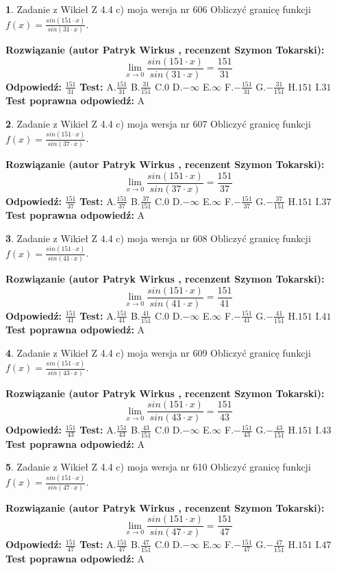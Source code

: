\documentclass[12pt, a4paper]{article}
\theoremstyle{definition} %
\newtheorem{zad}{}
\newcommand{\zadStart}[1]{\begin{zad}#1\newline}
\newcommand{\zadStop}{\end{zad}}
\newcommand{\rozwStart}[2]{\noindent \textbf{Rozwiązanie (autor #1 , recenzent #2): }\newline}
\newcommand{\rozwStop}{\newline}
\newcommand{\odpStart}{\noindent \textbf{Odpowiedź:}\newline}
\newcommand{\odpStop}{\newline}
\newcommand{\testStart}{\noindent \textbf{Test:}\newline}
\newcommand{\testStop}{\newline}
\newcommand{\kluczStart}{\noindent \textbf{Test poprawna odpowiedź:}\newline}
\newcommand{\kluczStop}{\newline}
\begin{document}
\zadStart{Zadanie z Wikieł Z 4.4 c) moja wersja nr 606}
Obliczyć granicę funkcji $f(x)=\frac{sin(151\cdot x)}{sin(31\cdot x)}$.
\zadStop
\rozwStart{Patryk Wirkus}{Szymon Tokarski}
$$\lim\limits_{x\to 0}\frac{sin(151\cdot x)}{sin(31\cdot x)}=
\frac{151}{31}$$
\rozwStop
\odpStart
$\frac{151}{31}$
\odpStop
\testStart
A.$\frac{151}{31}$
B.$\frac{31}{151}$
C.$0$
D.$-\infty$
E.$\infty$
F.$-\frac{151}{31}$
G.$-\frac{31}{151}$
H.$151$
I.$31$
\testStop
\kluczStart
A
\kluczStop



\zadStart{Zadanie z Wikieł Z 4.4 c) moja wersja nr 607}
Obliczyć granicę funkcji $f(x)=\frac{sin(151\cdot x)}{sin(37\cdot x)}$.
\zadStop
\rozwStart{Patryk Wirkus}{Szymon Tokarski}
$$\lim\limits_{x\to 0}\frac{sin(151\cdot x)}{sin(37\cdot x)}=
\frac{151}{37}$$
\rozwStop
\odpStart
$\frac{151}{37}$
\odpStop
\testStart
A.$\frac{151}{37}$
B.$\frac{37}{151}$
C.$0$
D.$-\infty$
E.$\infty$
F.$-\frac{151}{37}$
G.$-\frac{37}{151}$
H.$151$
I.$37$
\testStop
\kluczStart
A
\kluczStop



\zadStart{Zadanie z Wikieł Z 4.4 c) moja wersja nr 608}
Obliczyć granicę funkcji $f(x)=\frac{sin(151\cdot x)}{sin(41\cdot x)}$.
\zadStop
\rozwStart{Patryk Wirkus}{Szymon Tokarski}
$$\lim\limits_{x\to 0}\frac{sin(151\cdot x)}{sin(41\cdot x)}=
\frac{151}{41}$$
\rozwStop
\odpStart
$\frac{151}{41}$
\odpStop
\testStart
A.$\frac{151}{41}$
B.$\frac{41}{151}$
C.$0$
D.$-\infty$
E.$\infty$
F.$-\frac{151}{41}$
G.$-\frac{41}{151}$
H.$151$
I.$41$
\testStop
\kluczStart
A
\kluczStop



\zadStart{Zadanie z Wikieł Z 4.4 c) moja wersja nr 609}
Obliczyć granicę funkcji $f(x)=\frac{sin(151\cdot x)}{sin(43\cdot x)}$.
\zadStop
\rozwStart{Patryk Wirkus}{Szymon Tokarski}
$$\lim\limits_{x\to 0}\frac{sin(151\cdot x)}{sin(43\cdot x)}=
\frac{151}{43}$$
\rozwStop
\odpStart
$\frac{151}{43}$
\odpStop
\testStart
A.$\frac{151}{43}$
B.$\frac{43}{151}$
C.$0$
D.$-\infty$
E.$\infty$
F.$-\frac{151}{43}$
G.$-\frac{43}{151}$
H.$151$
I.$43$
\testStop
\kluczStart
A
\kluczStop



\zadStart{Zadanie z Wikieł Z 4.4 c) moja wersja nr 610}
Obliczyć granicę funkcji $f(x)=\frac{sin(151\cdot x)}{sin(47\cdot x)}$.
\zadStop
\rozwStart{Patryk Wirkus}{Szymon Tokarski}
$$\lim\limits_{x\to 0}\frac{sin(151\cdot x)}{sin(47\cdot x)}=
\frac{151}{47}$$
\rozwStop
\odpStart
$\frac{151}{47}$
\odpStop
\testStart
A.$\frac{151}{47}$
B.$\frac{47}{151}$
C.$0$
D.$-\infty$
E.$\infty$
F.$-\frac{151}{47}$
G.$-\frac{47}{151}$
H.$151$
I.$47$
\testStop
\kluczStart
A
\kluczStop
\end{document}
